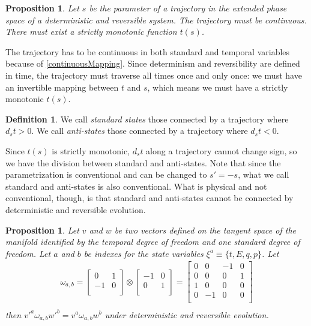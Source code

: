 \documentclass[aps,pra,10pt,twocolumn,floatfix,nofootinbib]{revtex4-1}
\newtheorem{prop}[thm]{Proposition}
\theoremstyle{definition}
\newtheorem{defn}[thm]{Definition}
\begin{document}
\begin{prop}\label{tdofMonotonic}
Let $s$ be the parameter of a trajectory in the extended phase space of a deterministic and reversible system. The trajectory must be continuous. There must exist a strictly monotonic function $t(s)$.
\end{prop}

The trajectory has to be continuous in both standard and temporal variables because of \ref{continuousMapping}. Since determinism and reversibility are defined in time, the trajectory must traverse all times once and only once: we must have an invertible mapping between $t$ and $s$, which means we must have a strictly monotonic $t(s)$.

\begin{defn}\label{tdofAntistates}
We call \emph{standard states} those connected by a trajectory where $d_{s}t>0$. We call \emph{anti-states} those connected by a trajectory where $d_{s}t<0$.
\end{defn}

Since $t(s)$ is strictly monotonic, $d_{s}t$ along a trajectory cannot change sign, so we have the division between standard and anti-states. Note that since the parametrization is conventional and can be changed to $s'=-s$, what we call standard and anti-states is also conventional. What is physical and not conventional, though, is that standard and anti-states cannot be connected by deterministic and reversible evolution.

\begin{prop}\label{tdofInvariant}
Let $v$ and $w$ be two vectors defined on the tangent space of the manifold identified by the temporal degree of freedom and one standard degree of freedom. Let $a$ and $b$ be indexes for the state variables $\xi^a\equiv\{t, E, q, p\}$. Let
\begin{align*}
\omega_{a, b} =  \left[
  \begin{array}{cc}
    0 & 1 \\
    -1 & 0 \\
  \end{array}
\right] \otimes \left[
  \begin{array}{cc}
    -1 & 0 \\
    0 & 1 \\
  \end{array}
\right]
= \left[
  \begin{array}{cccc}
    0 & 0 & -1 & 0 \\
    0 & 0 & 0 & 1 \\
    1 & 0 & 0 & 0 \\
    0 & -1 & 0 & 0 \\
  \end{array}
\right] \\
\end{align*}
then $v'^{a} \omega_{a, b} w'^{b}=v^{a} \omega_{a, b} w^{b}$ under deterministic and reversible evolution.
\end{prop}
\end{document}
